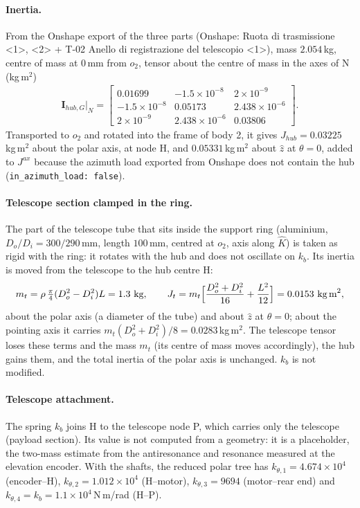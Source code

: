 \documentclass[10pt,a4paper]{article}
\numberwithin{equation}{section}
\begin{document}
\paragraph{Inertia.} From the Onshape export of the three parts (Onshape: Ruota di trasmissione <1>, <2> + T-02 Anello di registrazione del telescopio <1>), mass $2.054$\,kg, centre of mass at $0$\,mm from $o_2$, tensor about the centre of mass in the axes of N (kg\,m$^2$)
\begin{gather}
\mathbf I_{hub,G}|_N = \begin{bmatrix}0.01699 & -1.5\times10^{-8} & 2\times10^{-9} \\ -1.5\times10^{-8} & 0.05173 & 2.438\times10^{-6} \\ 2\times10^{-9} & 2.438\times10^{-6} & 0.03806\end{bmatrix}.
\end{gather}
Transported to $o_2$ and rotated into the frame of body 2, it gives $J_{hub} = 0.03225$\,kg\,m$^2$ about the polar axis, at node H, and $0.05331$\,kg\,m$^2$ about $\hat z$ at $\theta = 0$, added to $J^{ax}$ because the azimuth load exported from Onshape does not contain the hub (\texttt{in\_azimuth\_load: false}).
\paragraph{Telescope section clamped in the ring.} The part of the telescope tube that sits inside the support ring (aluminium, $D_o/D_i = 300/290$\,mm, length $100$\,mm, centred at $o_2$, axis along $\hat K$) is taken as rigid with the ring: it rotates with the hub and does not oscillate on $k_b$. Its inertia is moved from the telescope to the hub centre H:\begin{gather}m_t = \rho\,\tfrac{\pi}{4}(D_o^2 - D_i^2)L = 1.3\ \text{kg},\qquad J_t = m_t\Bigl[\frac{D_o^2 + D_i^2}{16} + \frac{L^2}{12}\Bigr] = 0.0153\ \text{kg\,m}^2,\end{gather}about the polar axis (a diameter of the tube) and about $\hat z$ at $\theta = 0$; about the pointing axis it carries $m_t(D_o^2 + D_i^2)/8 = 0.0283$\,kg\,m$^2$. The telescope tensor loses these terms and the mass $m_t$ (its centre of mass moves accordingly), the hub gains them, and the total inertia of the polar axis is unchanged. $k_b$ is not modified.
\paragraph{Telescope attachment.} The spring $k_b$ joins H to the telescope node P, which carries only the telescope (payload section). Its value is not computed from a geometry: it is a placeholder, the two-mass estimate from the antiresonance and resonance measured at the elevation encoder. With the shafts, the reduced polar tree has $k_{\theta,1} = 4.674\times10^{4}$ (encoder--H), $k_{\theta,2} = 1.012\times10^{4}$ (H--motor), $k_{\theta,3} = 9694$ (motor--rear end) and $k_{\theta,4} = k_b = 1.1\times10^{4}$\,N\,m/rad (H--P).
\end{document}
